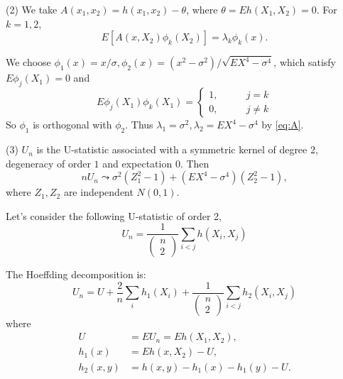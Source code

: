 \begin{solution}
(2) We  take $A(x_1, x_2) = h(x_1, x_2) - \theta$, where $\theta = E h(X_1, X_2) = 0$.
For $k=1,2$, 
\begin{equation}\label{eq:A}
    E[A(x,X_2)\phi_k(X_2)] = \lambda_k \phi_k(x).
\end{equation}

We choose $\phi_1(x) = x/\sigma, \phi_2(x) = (x^2-\sigma^2)/\sqrt{EX^4-\sigma^4}$, which satisfy $E\phi_j(X_1)=0$ and 
\begin{equation*}
    E\phi_j(X_1)\phi_k(X_1) = \left\{
    \begin{aligned}
        1, & \quad\quad j=k \\
        0, & \quad\quad j\neq k
    \end{aligned}
    \right.
\end{equation*}
So $\phi_1$ is orthogonal with $\phi_2$. Thus $\lambda_1 = \sigma^2, \lambda_2=EX^4-\sigma^4$ by \eqref{eq:A}.

(3) $U_n$ is the U-statistic associated with a symmetric kernel of degree 2, degeneracy of order $1$ and expectation $0$. Then
\begin{equation*}
        nU_n \leadsto \sigma^2(Z_1^2-1) + (EX^4-\sigma^4)(Z_2^2-1),
\end{equation*}
where $Z_1, Z_2$ are independent $N(0,1)$. 

\end{solution}




\begin{problem}
    

    Let's consider the following U-statistic of order 2,
    \begin{equation*}
        U_n = \frac{1}{ \begin{pmatrix} n \\ 2 \end{pmatrix} } \sum_{i<j} h(X_i,X_j)
    \end{equation*}

    The Hoeffding decomposition is:
    \begin{equation*}
        U_{n}=U+\frac{2}{n} \sum_{i} h_{1}\left(X_{i}\right)+\frac{1}{\begin{pmatrix} n\\2   \end{pmatrix}} \sum_{i<j} h_{2}\left(X_{i}, X_{j}\right)
    \end{equation*}
    where
    \begin{equation*}
        \begin{split}
            U & =  E U_{n}= E h\left(X_{1}, X_{2}\right), \\
            h_{1}(x) & =  E h\left(x, X_{2}\right)-U, \\ 
            h_{2}(x, y) & =  h(x, y)-h_{1}(x)-h_{1}(y)-U.
        \end{split}
    \end{equation*}
\end{problem}


